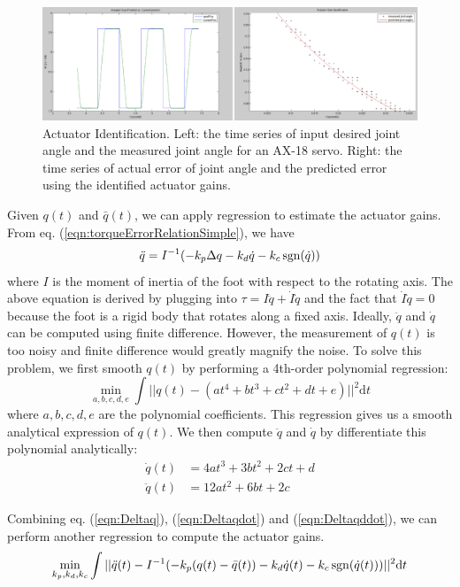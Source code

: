 \begin{figure}[!t]
  \centering
  \includegraphics[width=\textwidth]{figures/actuatorId}
  \caption{Actuator Identification. Left: the time series of input desired joint angle and the measured joint angle for an AX-18 servo. Right: the time series of actual error of joint angle and the predicted error using the identified actuator gains.  }
  \label{fig:actuatorId}
\end{figure}

Given $q(t)$ and $\bar{q}(t)$, we can apply regression to estimate the actuator gains. From eq. (\ref{eqn:torqueErrorRelationSimple}), we have
\begin{equation}
\ddot{q}=I^{-1}(-k_p\Delta q - k_d\dot{q} - k_c\operatorname{sgn}(\dot{q}))
\end{equation}
where $I$ is the moment of inertia of the foot with respect to the rotating axis. The above equation is derived by plugging into $\tau = I\ddot{q}+\dot{I}\dot{q}$ and the fact that $\dot{I}\dot{q}=0$ because the foot is a rigid body that rotates along a fixed axis. Ideally, $\ddot{q}$ and $\dot{q}$ can be computed using finite difference. However, the measurement of $q(t)$ is too noisy and finite difference would greatly magnify the noise. To solve this problem, we first smooth $q(t)$ by performing a 4th-order polynomial regression:
\begin{equation}
  \min_{a,b,c,d,e}\int ||q(t)-(at^4+bt^3+ct^2+dt+e)||^2\mathrm{d}t
  \label{eqn:Deltaq}
\end{equation}
where $a,b,c,d,e$ are the polynomial coefficients. This regression gives us a smooth analytical expression of $q(t)$. We then compute $\ddot{q}$ and $\dot{q}$ by differentiate this polynomial analytically:
\begin{align}
\label{eqn:Deltaqdot}  \dot{q}(t)&=4at^3+3bt^2+2ct+d\\
\label{eqn:Deltaqddot}  \ddot{q}(t)&=12at^2+6bt+2c
\end{align}

Combining eq. (\ref{eqn:Deltaq}), (\ref{eqn:Deltaqdot}) and (\ref{eqn:Deltaqddot}), we can perform another regression to compute the actuator gains.
\begin{equation}
\min_{k_p, k_d, k_c}\int||\ddot{q}(t)-I^{-1}(-k_p(q(t)-\bar{q}(t)) - k_d\dot{q}(t) - k_c\operatorname{sgn}(\dot{q}(t)))||^2\mathrm{d}t
\end{equation}

